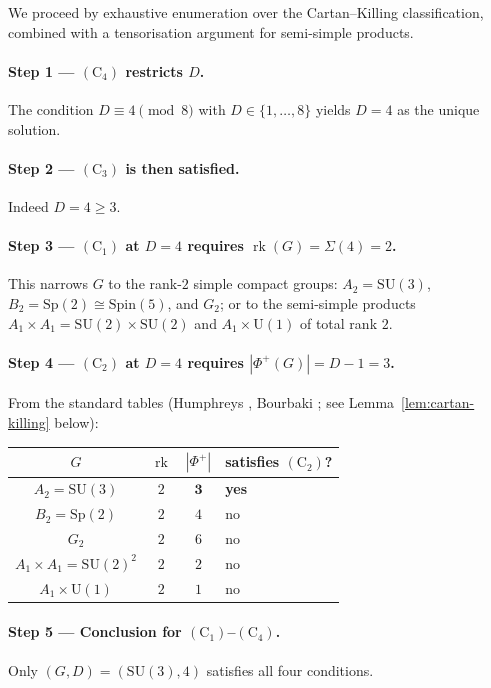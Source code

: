 \documentclass[11pt,reqno]{amsart}
\theoremstyle{plain}
\theoremstyle{definition}
\theoremstyle{remark}
\newcommand{\rk}{\operatorname{rk}}
\newcommand{\SU}{\mathrm{SU}}
\newcommand{\Cone}{(\mathrm{C}_1)}
\newcommand{\Ctwo}{(\mathrm{C}_2)}
\newcommand{\Cthree}{(\mathrm{C}_3)}
\newcommand{\Cfour}{(\mathrm{C}_4)}
\begin{document}
We proceed by exhaustive enumeration over the Cartan--Killing classification, combined with a tensorisation argument for semi-simple products.

\paragraph{Step 1 --- $\Cfour$ restricts $D$.}
The condition $D \equiv 4 \pmod 8$ with $D \in \{1, \dots, 8\}$ yields $D = 4$ as the unique solution.

\paragraph{Step 2 --- $\Cthree$ is then satisfied.}
Indeed $D = 4 \ge 3$.

\paragraph{Step 3 --- $\Cone$ at $D = 4$ requires $\rk(G) = \Sigma(4) = 2$.}
This narrows $G$ to the rank-$2$ simple compact groups: $A_2 = \SU(3)$, $B_2 = \mathrm{Sp}(2) \cong \mathrm{Spin}(5)$, and $G_2$; or to the semi-simple products $A_1 \times A_1 = \SU(2) \times \SU(2)$ and $A_1 \times \mathrm{U}(1)$ of total rank $2$.

\paragraph{Step 4 --- $\Ctwo$ at $D = 4$ requires $|\Phi^+(G)| = D - 1 = 3$.}
From the standard tables (Humphreys \cite{Humphreys1972}, Bourbaki \cite{BourbakiLie456}; see Lemma~\ref{lem:cartan-killing} below):

\begin{center}
\begin{tabular}{ccc>{\centering\arraybackslash}p{4cm}}
\toprule
$G$ & $\rk$ & $|\Phi^+|$ & satisfies $\Ctwo$? \\
\midrule
$A_2 = \SU(3)$ & $2$ & $\mathbf{3}$ & \textbf{yes} \\
$B_2 = \mathrm{Sp}(2)$ & $2$ & $4$ & no \\
$G_2$ & $2$ & $6$ & no \\
$A_1 \times A_1 = \SU(2)^2$ & $2$ & $2$ & no \\
$A_1 \times \mathrm{U}(1)$ & $2$ & $1$ & no \\
\bottomrule
\end{tabular}
\end{center}

\paragraph{Step 5 --- Conclusion for $\Cone$--$\Cfour$.}
Only $(G, D) = (\SU(3), 4)$ satisfies all four conditions.
\end{document}
